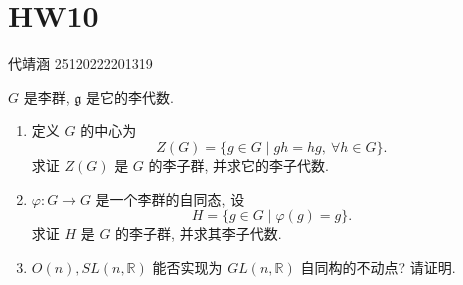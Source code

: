 \documentclass[../main.tex]{subfiles}
\begin{document}
\ifSubfilesClassLoaded{

    
    \setcounter{chapter}{9}
}{}

\chapter{ HW10 }
 代靖涵 25120222201319
\begin{exercise}{}{} 
\(G\) 是李群, \(\mathfrak g\) 是它的李代数.

\begin{enumerate}
\item 定义 \(G\) 的中心为
\[
Z(G)=\{g\in G\mid gh=hg,\ \forall h\in G\}.
\]
求证 \(Z(G)\) 是 \(G\) 的李子群, 并求它的李子代数.

\item \(\varphi:G\to G\) 是一个李群的自同态, 设
\[
H=\{g\in G\mid \varphi(g)=g\}.
\]
求证 \(H\) 是 \(G\) 的李子群, 并求其李子代数.

\item \(O(n),SL(n,\mathbb R)\) 能否实现为 \(GL(n,\mathbb R)\) 自同构的不动点? 请证明.
\end{enumerate}
\end{exercise}
\end{document}
